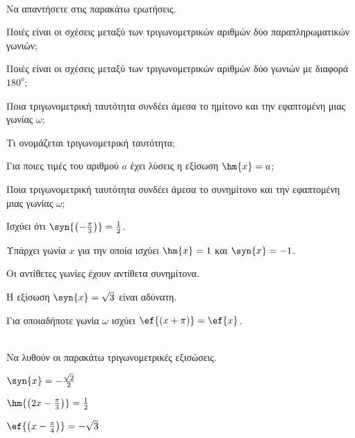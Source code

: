 \documentclass[twoside,nofonts,internet,math,spyros]{frontisthrio-diag}
\begin{document}
\vspace{-1.5cm}
\begin{thema}
\item\mbox{}\\
\vspace{-7mm}
\begin{erwthma}
\item Να απαντήσετε στις παρακάτω ερωτήσεις.
\begin{alist}
\item Ποιές είναι οι σχέσεις μεταξύ των τριγωνομετρικών αριθμών δύο παραπληρωματικών γωνιών;
\item Ποιές είναι οι σχέσεις μεταξύ των τριγωνομετρικών αριθμών δύο γωνιών με διαφορά $ 180^o $;
\item Ποια τριγωνομετρική ταυτότητα συνδέει άμεσα το ημίτονο και την εφαπτομένη μιας γωνίας $ \omega $;
\item Τι ονομάζεται τριγωνομετρική ταυτότητα;
\item Για ποιες τιμές του αριθμού $ a $ έχει λύσεις η εξίσωση $ \hm{x}=a $;
\item Ποια τριγωνομετρική ταυτότητα συνδέει άμεσα το συνημίτονο και την εφαπτομένη μιας γωνίας $ \omega $;
\end{alist}
\item \swstolathos
\begin{alist}
\item Ισχύει ότι $ \syn{\left(- \frac{\pi}{3}\right)}=\frac{1}{2} $.
\item Υπάρχει γωνία $ x $ για την οποία ισχύει $ \hm{x}=1 $ και $ \syn{x}=-1 $.
\item Οι αντίθετες γωνίες έχουν αντίθετα συνημίτονα.
\item Η εξίσωση $ \syn{x}=\sqrt{3} $ είναι αδύνατη.
\item Για οποιαδήποτε γωνία $ \omega $ ισχύει $ \ef{(x+\pi)}=\ef{x} $.
\end{alist}
\end{erwthma}
\item\mbox{}\\
Να λυθούν οι παρακάτω τριγωνομετρικές εξισώσεις.
\begin{erwthma}
\item $ \syn{x}=-\frac{\sqrt{2}}{2} $
\item $ \hm{\left( 2x-\frac{\pi}{3}\right)}=\frac{1}{2} $
\item $ \ef{\left(x-\frac{\pi}{4}\right)}=-\sqrt{3} $
\end{erwthma}

\end{thema}
\end{document}
